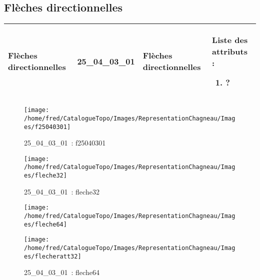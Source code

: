 \documentclass[12pt,titlepage]{book}
\begin{document}
\subsection{Flèches directionnelles}
\noindent
\vspace{\baselineskip}

\renewcommand{\arraystretch}{1.2}
\begin{supertabular}{|p{10cm}|c|p{13cm}|p{12cm}|}
 Flèches directionnelles & 25\_04\_03\_01 & Flèches directionnelles & Liste des attributs :
\begin{enumerate}
  \item ?\end{enumerate}
\\
\hline
\end{supertabular}
\begin{figure}[h!]
  \hfill         %
  \begin{minipage}[t]{3cm}
    \begin{center}
      \texttt{[image: /home/fred/CatalogueTopo/Images/RepresentationChagneau/Images/f25040301]}
      \caption[~25\_04\_03\_01]{\small{25\_04\_03\_01~:} \tiny{f25040301}}\label{f25040301}
    \end{center}
  \end{minipage}
  \begin{minipage}[t]{3cm}
    \begin{center}
      \texttt{[image: /home/fred/CatalogueTopo/Images/RepresentationChagneau/Images/fleche32]}
      \caption[~25\_04\_03\_01]{\small{25\_04\_03\_01~:} \tiny{fleche32}}\label{fleche32}
    \end{center}
  \end{minipage}
  \begin{minipage}[t]{3cm}
    \begin{center}
      \texttt{[image: /home/fred/CatalogueTopo/Images/RepresentationChagneau/Images/fleche64]}
      \caption[~25\_04\_03\_01]{\small{25\_04\_03\_01~:} \tiny{fleche64}}\label{fleche64}
    \end{center}
  \end{minipage}
  \begin{minipage}[t]{3cm}
    \begin{center}
      \texttt{[image: /home/fred/CatalogueTopo/Images/RepresentationChagneau/Images/flecheratt32]}

\end{center}
\end{minipage}
\end{figure}
\end{document}
